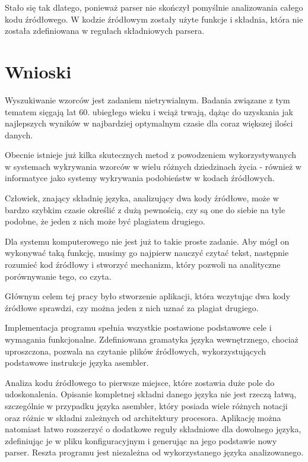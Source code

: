 \documentclass[a4paper,12pt]{article}
\begin{document}
Stało się tak dlatego, ponieważ parser nie skończył pomyślnie analizowania całego kodu źródłowego. W kodzie źródłowym zostały użyte funkcje i składnia, która nie została zdefiniowana w regułach składniowych parsera.

\newpage

\section{Wnioski}
Wyszukiwanie wzorców jest zadaniem nietrywialnym. Badania związane z tym tematem sięgają lat 60. ubiegłego wieku i wciąż trwają, dążąc do uzyskania jak najlepszych wyników w najbardziej optymalnym czasie dla coraz większej ilości danych.

Obecnie istnieje już kilka skutecznych metod z powodzeniem wykorzystywanych w systemach wykrywania wzorców w wielu różnych dziedzinach życia - również w informatyce jako systemy wykrywania podobieństw w kodach źródłowych.

Człowiek, znający składnię języka, analizujący dwa kody źródłowe, może w bardzo szybkim czasie określić z dużą pewnością, czy są one do siebie na tyle podobne, że jeden z nich może być plagiatem drugiego. 

Dla systemu komputerowego nie jest już to takie proste zadanie. Aby mógł on wykonywać taką funkcję, musimy go najpierw nauczyć czytać tekst, następnie rozumieć kod źródłowy i stworzyć mechanizm, który pozwoli na analityczne porównywanie tego, co czyta.

Głównym celem tej pracy było stworzenie aplikacji, która wczytując dwa kody źródłowe sprawdzi, czy można jeden z nich uznać za plagiat drugiego.

Implementacja programu spełnia wszystkie postawione podstawowe cele i wymagania funkcjonalne. Zdefiniowana gramatyka języka wewnętrznego, chociaż uproszczona, pozwala na czytanie plików źródłowych, wykorzystujących podstawowe instrukcje języka asembler.

Analiza kodu źródłowego to pierwsze miejsce, które zostawia duże pole do udoskonalenia. Opisanie kompletnej składni danego języka nie jest rzeczą łatwą, szczególnie w przypadku języka asembler, który posiada wiele różnych notacji oraz różnic w składni zależnych od architektury procesora. Aplikację można natomiast łatwo rozszerzyć o dodatkowe reguły składniowe dla dowolnego języka, zdefiniując je w pliku konfiguracyjnym i generując na jego podstawie nowy parser. Reszta programu jest niezależna od wykorzystanego języka analizowanego.
\end{document}
